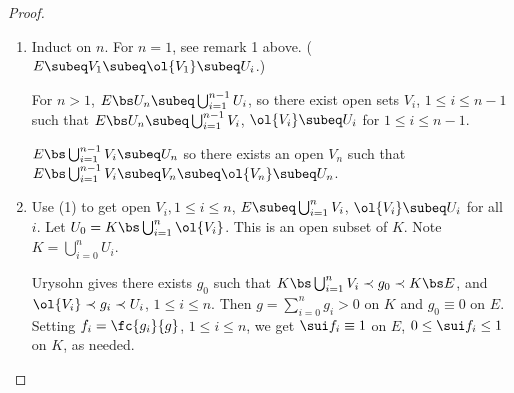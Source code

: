 \begin{proof}
\begin{enumerate}
\item
Induct on $n$. For $n=1$, see remark 1 above. ($E\subeq V_1\subeq \ol{V_1}\subeq U_i$.)

For $n>1$, $E\bs U_n\subeq \bigcup_{i=1}^{n-1}U_i$, so there exist open sets $V_i$, $1\le i\le n-1$ such that $E\bs U_n\subeq \bigcup_{i=1}^{n-1} V_i$, $\ol{V_i}\subeq U_i$ for $1\le i\le n-1$.

$E\bs \bigcup_{i=1}^{n-1} V_i\subeq U_n$ so there exists an open $V_n$ such that $E\bs\bigcup_{i=1}^{n-1} V_i\subeq V_n\subeq \ol{V_n}\subeq U_n$.
\item
Use (1) to get open $V_i,1\le i\le n$, $E\subeq \bigcup_{i=1}^n V_i$, $\ol{V_i}\subeq U_i$ for all $i$. Let $U_0=K\bs \bigcup_{i=1}^n \ol{V_i}$. This is an open subset of $K$. Note $K=\bigcup_{i=0}^n U_i$. 





Urysohn gives there exists $g_0$ such that  $K\bs \bigcup_{i=1}^n V_i\prec g_0\prec K\bs E$, and $\ol{V_i}\prec g_i\prec U_i$, $1\le i\le n$. 
Then $g=\sum_{i=0}^n g_i>0$ on $K$ and $g_0\equiv 0$ on $E$. Setting $f_i=\fc{g_i}{g}$, $1\le i\le n$, we get $\sui f_i\equiv 1$ on $E$, $0\le \sui f_i\le 1$ on $K$, as needed.
\end{enumerate}
\end{proof}
